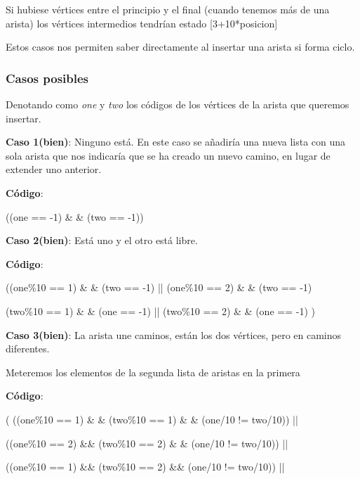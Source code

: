 Si hubiese vértices entre el principio y el final (cuando tenemos más de una arista) los vértices intermedios tendrían estado [3+10*posicion]

Estos casos nos permiten saber directamente al insertar una arista si forma ciclo.




\subsubsection{Casos posibles}
Denotando como \textit{one} y \textit{two} los códigos de los vértices de la arista que queremos insertar.


\textbf{Caso 1(bien)}: Ninguno está. En este caso se añadiría una nueva lista con una sola arista que nos indicaría que se ha creado un nuevo camino,                 en lugar de extender uno anterior.


\textbf{Código}: 

\hspace{1cm}((one == -1) \& \& (two == -1))

\textbf{Caso 2(bien)}: Está uno y el otro está libre.
      

\textbf{Código}: 

\hspace{1cm}((one\%10 == 1) \& \& (two == -1) || (one\%10 == 2) \& \& (two == -1)
                 
\hspace{1cm}(two\%10 == 1) \& \& (one == -1) || (two\%10 == 2) \& \& (one == -1) )

 
\textbf{Caso 3(bien)}: La arista une caminos, están los dos vértices, pero en caminos diferentes.


Meteremos los elementos de la segunda lista de aristas en la primera
            
\textbf{Código}:

\hspace{1cm}( ((one\%10 == 1) \& \& (two\%10 == 1) \& \& (one/10 != two/10)) ||
                     
\hspace{1cm}((one\%10 == 2) \&\& (two\%10 == 2) \& \& (one/10 != two/10)) ||

\hspace{1cm}((one\%10 == 1) \&\& (two\%10 == 2) \&\& (one/10 != two/10)) ||

